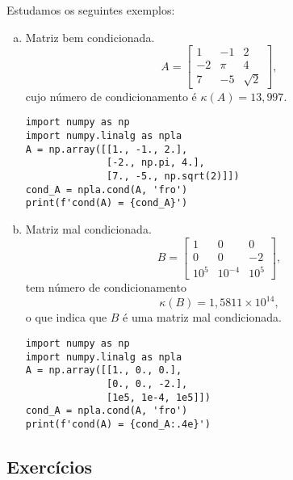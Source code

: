 \begin{ex}\label{ex:kappa}
  Estudamos os seguintes exemplos:
  \begin{enumerate}[a)]
  \item Matriz bem condicionada.
    \begin{equation}
      A =
      \begin{bmatrix}
        1 & -1 & 2\\
        -2 & \pi & 4\\
        7 & -5 & \sqrt{2}
      \end{bmatrix},
    \end{equation}
    cujo número de condicionamento é $\kappa(A) = 13,997$.

    \begin{lstlisting}
import numpy as np
import numpy.linalg as npla
A = np.array([[1., -1., 2.],
              [-2., np.pi, 4.],
              [7., -5., np.sqrt(2)]])
cond_A = npla.cond(A, 'fro')
print(f'cond(A) = {cond_A}')
\end{lstlisting}

  \item Matriz mal condicionada.
    \begin{equation}
      B =
      \begin{bmatrix}
        1 & 0 & 0\\
        0 & 0 & -2\\
        10^{5} & 10^{-4} & 10^{5}
      \end{bmatrix},    
    \end{equation}
    tem número de condicionamento
    \begin{equation}
      \kappa(B) = 1,5811\times 10^{14},
    \end{equation}
    o que indica que $B$ é uma matriz mal condicionada.

    \begin{lstlisting}
import numpy as np
import numpy.linalg as npla
A = np.array([[1., 0., 0.],
              [0., 0., -2.],
              [1e5, 1e-4, 1e5]])
cond_A = npla.cond(A, 'fro')
print(f'cond(A) = {cond_A:.4e}')
\end{lstlisting}

  \end{enumerate}
\end{ex}

\subsection{Exercícios}

